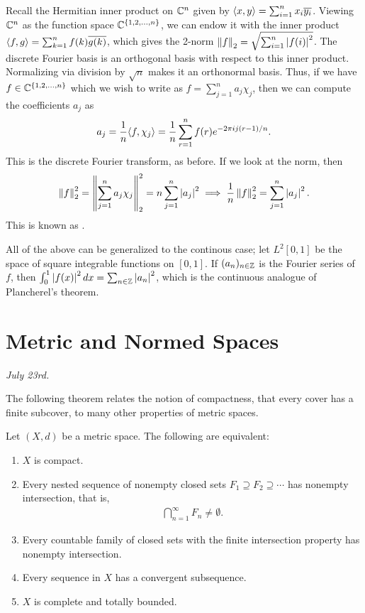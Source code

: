 Recall the Hermitian inner product on $\mathbb{C}^{n}$ given by $\langle x,y\rangle = \sum_{i=1}^{n} x_{i} \overline{y_{i}}$. Viewing $\mathbb{C}^{n}$ as the function space $\mathbb{C}^{\{1,2,\ldots,n\}}$, we can endow it with the inner product $\langle f,g\rangle = \sum_{k=1}^{n} f(k) \overline{g(k)}$, which gives the 2-norm $\left\lVert f\right\rVert_{2} = \sqrt{\sum_{i=1}^{n} \left| f(i) \right|^{2}}$. The discrete Fourier basis is an orthogonal basis with respect to this inner product. Normalizing via division by $\sqrt{n}$ makes it an orthonormal basis. Thus, if we have $f \in \mathbb{C}^{\{1,2,\ldots,n\}}$ which we wish to write as $f = \sum_{j=1}^{n} a_{j} \chi_{j}$, then we can compute the coefficients $a_{j}$ as
\begin{align}
    a_{j} = \frac{1}{n} \langle f,\chi_{j}\rangle = \frac{1}{n} \sum_{r=1}^{n} f(r) e^{-2\pi i j(r-1)/n}.
\end{align}
This is the discrete Fourier transform, as before. If we look at the norm, then
\begin{align}
    \left\lVert f\right\rVert_{2}^{2} = \left\lVert\sum_{j=1}^{n} a_{j} \chi_{j}\right\rVert_{2}^{2} = n \sum_{j=1}^{n} \left| a_{j} \right|^{2} \implies \frac{1}{n} \left\lVert f\right\rVert_{2}^{2} = \sum_{j=1}^{n} \left| a_{j} \right|^{2}.
\end{align}
This is known as .

All of the above can be generalized to the continous case; let $L^{2}[0,1]$ be the space of square integrable functions on $[0,1]$. If $(a_{n})_{n \in \mathbb{Z}}$ is the Fourier series of $f$, then $\int_{0}^{1} \left| f(x) \right|^{2} dx = \sum_{n \in \mathbb{Z}} \left| a_{n} \right|^{2}$, which is the continuous analogue of Plancherel's theorem.

\section{Metric and Normed Spaces}
\textit{July 23rd.}

The following theorem relates the notion of compactness, that every cover has a finite subcover, to many other properties of metric spaces.

\begin{theorem}
Let $(X,d)$ be a metric space. The following are equivalent:
\begin{enumerate}
    \item $X$ is compact.
    \item Every nested sequence of nonempty closed sets $F_1 \supseteq F_2 \supseteq \cdots$ has nonempty intersection, that is,
    \begin{align}
        \bigcap_{n=1}^{\infty} F_n \neq \emptyset.
    \end{align}
    \item Every countable family of closed sets with the finite intersection property has nonempty intersection.
    \item Every sequence in $X$ has a convergent subsequence.
    \item $X$ is complete and totally bounded.
\end{enumerate}
\end{theorem}



